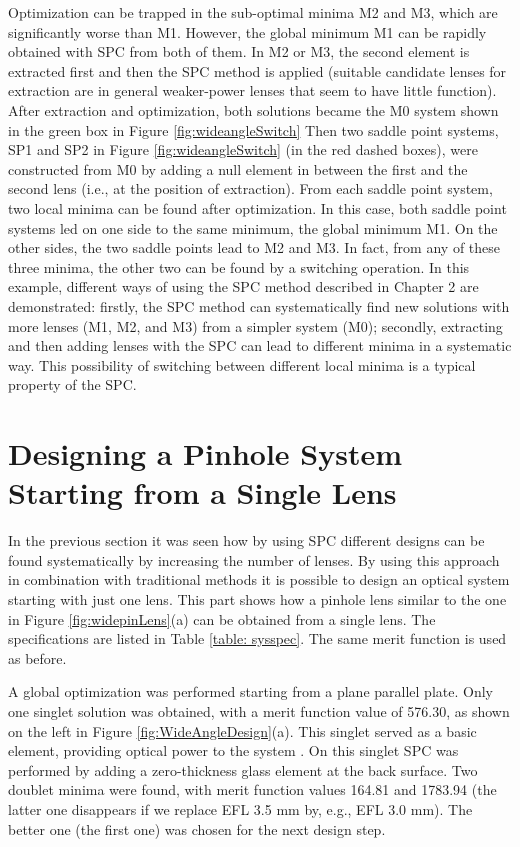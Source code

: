 Optimization can be trapped in the sub-optimal minima M2 and M3, which are significantly worse than M1. However, the global minimum M1 can be rapidly obtained with SPC from both of them. In M2 or M3, the second element is extracted first and then the SPC method is applied (suitable candidate lenses for extraction are in general weaker-power lenses that seem to have little function). After extraction and optimization, both solutions became the M0 system shown in the green box in Figure \ref{fig:wideangleSwitch} Then two saddle point systems, SP1 and SP2 in Figure \ref{fig:wideangleSwitch} (in the red dashed boxes), were constructed from M0 by adding a null element in between the first and the second lens (i.e., at the position of extraction). From each saddle point system, two local minima can be found after optimization. In this case, both saddle point systems led on one side to the same minimum, the global minimum M1. On the other sides, the two saddle points lead to M2 and M3. In fact, from any of these three minima, the other two can be found by a switching operation. In this example, different ways of using the SPC method described in Chapter 2 are demonstrated: firstly, the SPC method can systematically find new solutions with more lenses (M1, M2, and M3) from a simpler system (M0); secondly, extracting and then adding lenses with the SPC can lead to different minima in a systematic way. This possibility of switching between different local minima is a typical property of the SPC.
\section{Designing a Pinhole System Starting from a Single Lens} \label{chrom90d}

In the previous section it was seen how by using SPC different designs can be found systematically by increasing the number of lenses. By using this approach in combination with traditional methods it is possible to design an optical system starting with just one lens. This part shows how a pinhole lens similar to the one in Figure \ref{fig:widepinLens}(a) can be obtained from a single lens. The specifications are listed in Table \ref{table: sysspec}. The same merit function is used as before.

A global optimization was performed starting from a plane parallel plate. Only one singlet solution was obtained, with a merit function value of 576.30, as shown on the left in Figure \ref{fig:WideAngleDesign}(a). This singlet served as a basic element, providing optical power to the system \cite{LivshitsQA2013}. On this singlet SPC was performed by adding a zero-thickness glass element at the back surface. Two doublet minima were found, with merit function values 164.81 and 1783.94 (the latter one disappears if we replace EFL 3.5 mm by, e.g., EFL 3.0 mm). The better one (the first one) was chosen for the next design step. 


